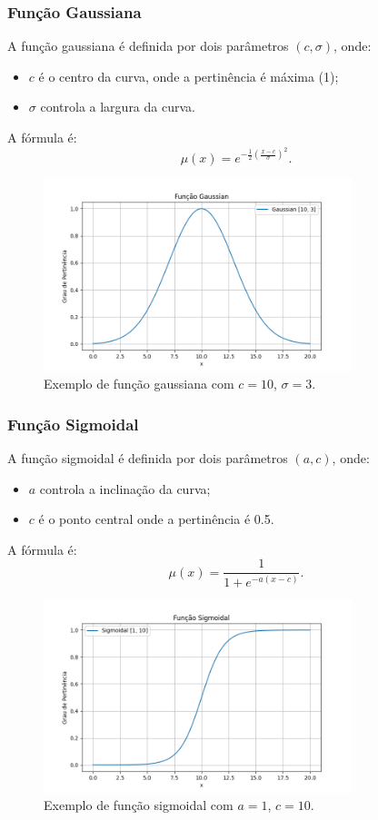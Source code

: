 \documentclass[a4paper,12pt]{article}
\begin{document}
\subsubsection{Função Gaussiana}
A função gaussiana é definida por dois parâmetros $(c, \sigma)$, onde:
\begin{itemize}
    \item $c$ é o centro da curva, onde a pertinência é máxima (1);
    \item $\sigma$ controla a largura da curva.
\end{itemize}
A fórmula é:
\[
\mu(x) = e^{-\frac{1}{2} \left( \frac{x - c}{\sigma} \right)^2}.
\]
\begin{figure}[H]
    \centering
    \includegraphics[width=0.8\textwidth]{img/gaussian.png}
    \caption{Exemplo de função gaussiana com $c=10$, $\sigma=3$.}
\end{figure}

\subsubsection{Função Sigmoidal}
A função sigmoidal é definida por dois parâmetros $(a, c)$, onde:
\begin{itemize}
    \item $a$ controla a inclinação da curva;
    \item $c$ é o ponto central onde a pertinência é 0.5.
\end{itemize}
A fórmula é:
\[
\mu(x) = \frac{1}{1 + e^{-a(x - c)}}.
\]

\begin{figure}[H]
    \centering
    \includegraphics[width=0.8\textwidth]{img/sigmoidal.png}
    \caption{Exemplo de função sigmoidal com $a=1$, $c=10$.}
\end{figure}
\end{document}
